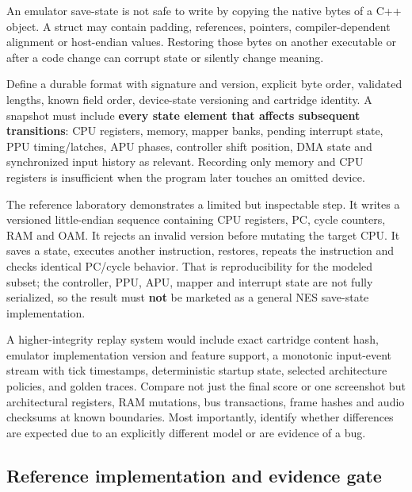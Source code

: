 \hypertarget{06-engine-ii-ch042-deterministic-replay-requires-an-explicit-state-contract}{}

An emulator save-state is not safe to write by copying the native bytes of a C++ object. A struct may contain padding, references, pointers, compiler-dependent alignment or host-endian values. Restoring those bytes on another executable or after a code change can corrupt state or silently change meaning.

Define a durable format with signature and version, explicit byte order, validated lengths, known field order, device-state versioning and cartridge identity. A snapshot must include \textbf{every state element that affects subsequent transitions}: CPU registers, memory, mapper banks, pending interrupt state, PPU timing/latches, APU phases, controller shift position, DMA state and synchronized input history as relevant. Recording only memory and CPU registers is insufficient when the program later touches an omitted device.

The reference laboratory demonstrates a limited but inspectable step. It writes a versioned little-endian sequence containing CPU registers, PC, cycle counters, RAM and OAM. It rejects an invalid version before mutating the target CPU. It saves a state, executes another instruction, restores, repeats the instruction and checks identical PC/cycle behavior. That is reproducibility for the modeled subset; the controller, PPU, APU, mapper and interrupt state are not fully serialized, so the result must \textbf{not} be marketed as a general NES save-state implementation.

A higher-integrity replay system would include exact cartridge content hash, emulator implementation version and feature support, a monotonic input-event stream with tick timestamps, deterministic startup state, selected architecture policies, and golden traces. Compare not just the final score or one screenshot but architectural registers, RAM mutations, bus transactions, frame hashes and audio checksums at known boundaries. Most importantly, identify whether differences are expected due to an explicitly different model or are evidence of a bug.

\subsection{Reference implementation and evidence gate}\label{06-engine-ii-ch042-reference-implementation-and-evidence-gate}

\hypertarget{06-engine-ii-ch042-reference-implementation-and-evidence-gate}{}


